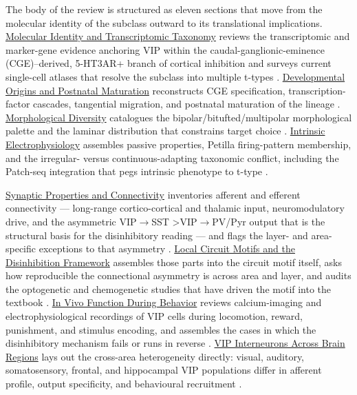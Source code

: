\documentclass[11pt]{article}
\let\origrightarrow\rightarrow
\def\rightarrow{\ensuremath{\origrightarrow}}
\begin{document}
The body of the review is structured as eleven sections that move from the molecular identity of the subclass outward to its translational implications. \href{/classification}{Molecular Identity and Transcriptomic Taxonomy} reviews the transcriptomic and marker-gene evidence anchoring VIP within the caudal-ganglionic-eminence (CGE)--derived, 5-HT3AR+ branch of cortical inhibition and surveys current single-cell atlases that resolve the subclass into multiple t-types \citep{Rudy2011, Tasic2016, Tasic2018, Hodge2019, Yao2023, Lee2023a, Gouwens2020a}. \href{/development}{Developmental Origins and Postnatal Maturation} reconstructs CGE specification, transcription-factor cascades, tangential migration, and postnatal maturation of the lineage \citep{Fishell2011, Lodato2011, Vogt2014, Mayer2018, Batistabrito2017, Vucurovic2010}. \href{/morphology}{Morphological Diversity} catalogues the bipolar/bitufted/multipolar morphological palette and the laminar distribution that constrains target choice \citep{Cauli1997, Cauli2014, Pronneke2015, Apicella2022, Emmenegger2018, Gouwens2019}. \href{/electrophysiology}{Intrinsic Electrophysiology} assembles passive properties, Petilla firing-pattern membership, and the irregular- versus continuous-adapting taxonomic conflict, including the Patch-seq integration that pegs intrinsic phenotype to t-type \citep{Tremblay2016, Gouwens2020a}.

\href{/synaptic-properties}{Synaptic Properties and Connectivity} inventories afferent and efferent connectivity --- long-range cortico-cortical and thalamic input, neuromodulatory drive, and the asymmetric VIP\rightarrow SST \textgreater  VIP\rightarrow PV/Pyr output that is the structural basis for the disinhibitory reading --- and flags the layer- and area-specific exceptions to that asymmetry \citep{Pi2013, Pfeffer2013, Lee2013, Karnani2016a, Karnani2016b, Wall2016, Schneidermizell2025}. \href{/disinhibition-framework}{Local Circuit Motifs and the Disinhibition Framework} assembles those parts into the circuit motif itself, asks how reproducible the connectional asymmetry is across area and layer, and audits the optogenetic and chemogenetic studies that have driven the motif into the textbook \citep{Pi2013, Lee2013, Fu2014, Karnani2016a, Cichon2017, Williams2019, Veit2023}. \href{/in-vivo-behavior}{In Vivo Function During Behavior} reviews calcium-imaging and electrophysiological recordings of VIP cells during locomotion, reward, punishment, and stimulus encoding, and assembles the cases in which the disinhibitory mechanism fails or runs in reverse \citep{Pakan2016, Dipoppa2018, Yavorska2021, Bigelow2019}. \href{/cross-areas}{VIP Interneurons Across Brain Regions} lays out the cross-area heterogeneity directly: visual, auditory, somatosensory, frontal, and hippocampal VIP populations differ in afferent profile, output specificity, and behavioural recruitment \citep{Pi2013, Dipoppa2018, Bastos2023a, Anastasiades2021a, Tyan2014, Gulyas1996, Kawaguchi1996}.
\end{document}
